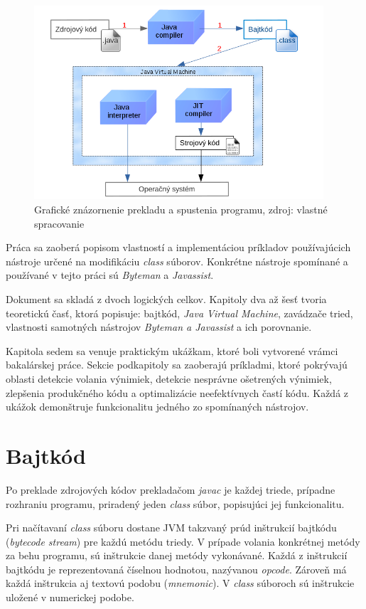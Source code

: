 \documentclass[11pt,final,oneside]{fithesis}
\begin{document}
\begin{figure}[h]
  \centering
   \includegraphics[width=0.96\textwidth]{JVM.png}
  \caption{Grafické znázornenie prekladu a spustenia programu, zdroj: vlastné
  spracovanie}
  \label{fig:jvm}
\end{figure}

Práca sa zaoberá popisom vlastností a implementáciou príkladov používajúcich 
nástroje určené na modifikáciu \textit{class} súborov. Konkrétne nástroje 
spomínané a používané v tejto práci sú \textit{Byteman} a \textit{Javassist}.

Dokument sa skladá z dvoch logických celkov. Kapitoly dva až šesť tvoria
teoretickú časť, ktorá popisuje: bajtkód, \textit{Java Virtual Machine},
zavádzače tried, vlastnosti samotných nástrojov \textit{Byteman a Javassist}
a ich porovnanie. 

Kapitola sedem sa venuje praktickým ukážkam, ktoré boli vytvorené vrámci
bakalárskej práce. Sekcie podkapitoly sa zaoberajú príkladmi, ktoré pokrývajú
oblasti detekcie volania výnimiek, detekcie nesprávne ošetrených výnimiek,
zlepšenia produkčného kódu a optimalizácie neefektívnych častí kódu. Každá z
ukážok demonštruje funkcionalitu jedného zo spomínaných nástrojov.

\chapter{Bajtkód}
\label{chap:bytecode}

Po preklade zdrojových kódov prekladačom \textit{javac} je každej
triede, prípadne rozhraniu programu, priradený jeden \textit{class} súbor,
popisujúci jej funkcionalitu.

Pri načítavaní \textit{class} súboru dostane JVM takzvaný prúd inštrukcií
bajtkódu (\textit{bytecode stream}) pre každú metódu triedy. V prípade volania
konkrétnej metódy za behu programu, sú inštrukcie danej metódy vykonávané.
Každá z inštrukcií bajtkódu je reprezentovaná číselnou hodnotou, nazývanou
\textit{opcode}. Zároveň má každá inštrukcia aj textovú podobu (\textit
{mnemonic}). V \textit{class} súboroch sú inštrukcie uložené v numerickej 
podobe.
\end{document}
